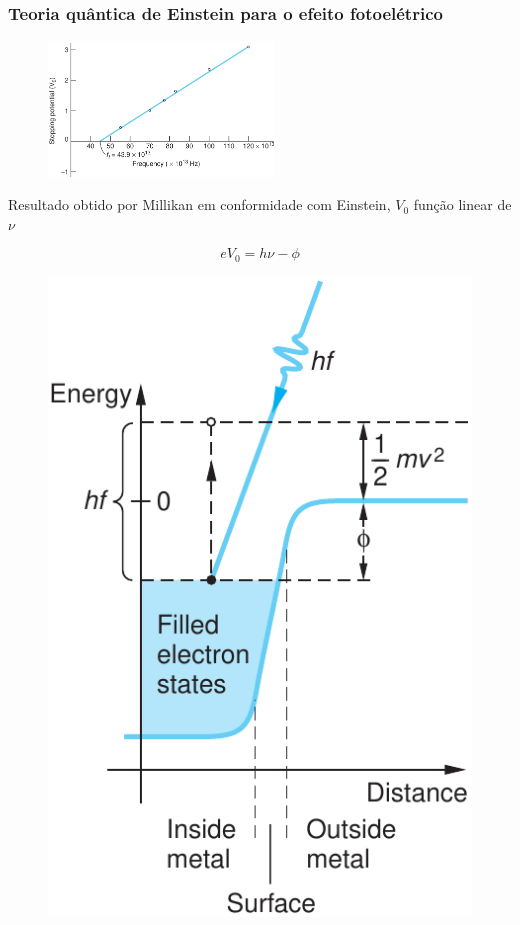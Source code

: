 \documentclass[12pt,brazil]{beamer}
\begin{document}

\begin{frame}
  \frametitle{Teoria quântica de Einstein para o efeito fotoelétrico}

  \begin{multicols}{2}
    \begin{minipage}[b][20ex][t]{\linewidth}
    \vspace*{0.25cm}
      \begin{figure}
        \includegraphics[width=6.0cm]{figuras/fig16}
      \end{figure}
      \fontsize{8pt}{11pt}\selectfont
      Resultado obtido por Millikan em conformidade com Einstein, $V_0$ função linear de $\nu$
    \end{minipage}

    \begin{minipage}[b][20ex][t]{\linewidth}    
    \vspace*{1.25cm}
      \[
       eV_0 = h\nu - \phi
      \]
    \end{minipage}

    \begin{minipage}[b][40ex][t]{\linewidth}
    \vspace*{-1cm}
      \begin{figure}
        \includegraphics[width=5.cm]{figuras/fig15}
      \end{figure}
      
    \end{minipage}
  \end{multicols} 

\end{frame}
\end{document}
